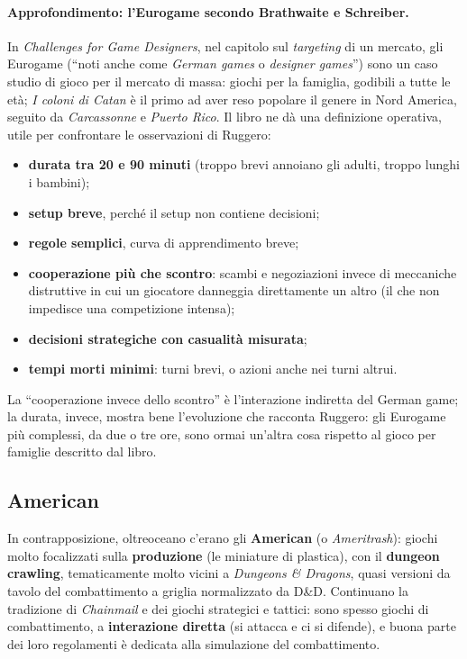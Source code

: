 \paragraph{Approfondimento: l'Eurogame secondo Brathwaite e Schreiber.} In
\emph{Challenges for Game Designers}, nel capitolo sul \emph{targeting} di un
mercato, gli Eurogame (``noti anche come \emph{German games} o \emph{designer
games}'') sono un caso studio di gioco per il mercato di massa: giochi per la
famiglia, godibili a tutte le età; \emph{I coloni di Catan} è il primo ad aver
reso popolare il genere in Nord America, seguito da \emph{Carcassonne} e
\emph{Puerto Rico}. Il libro ne dà una definizione operativa, utile per
confrontare le osservazioni di Ruggero:
\begin{itemize}
  \item \textbf{durata tra 20 e 90 minuti} (troppo brevi annoiano gli adulti,
        troppo lunghi i bambini);
  \item \textbf{setup breve}, perché il setup non contiene decisioni;
  \item \textbf{regole semplici}, curva di apprendimento breve;
  \item \textbf{cooperazione più che scontro}: scambi e negoziazioni invece di
        meccaniche distruttive in cui un giocatore danneggia direttamente un
        altro (il che non impedisce una competizione intensa);
  \item \textbf{decisioni strategiche con casualità misurata};
  \item \textbf{tempi morti minimi}: turni brevi, o azioni anche nei turni
        altrui.
\end{itemize}
La ``cooperazione invece dello scontro'' è l'interazione indiretta del German
game; la durata, invece, mostra bene l'evoluzione che racconta Ruggero: gli
Eurogame più complessi, da due o tre ore, sono ormai un'altra cosa rispetto al
gioco per famiglie descritto dal libro.

\subsection{American}

In contrapposizione, oltreoceano c'erano gli \textbf{American} (o
\emph{Ameritrash}): giochi molto focalizzati sulla \textbf{produzione} (le
miniature di plastica), con il \textbf{dungeon crawling}, tematicamente molto
vicini a \emph{Dungeons \& Dragons}, quasi versioni da tavolo del combattimento a
griglia normalizzato da D\&D. Continuano la tradizione di \emph{Chainmail} e dei
giochi strategici e tattici: sono spesso giochi di combattimento, a
\textbf{interazione diretta} (si attacca e ci si difende), e buona parte dei loro
regolamenti è dedicata alla simulazione del combattimento.

